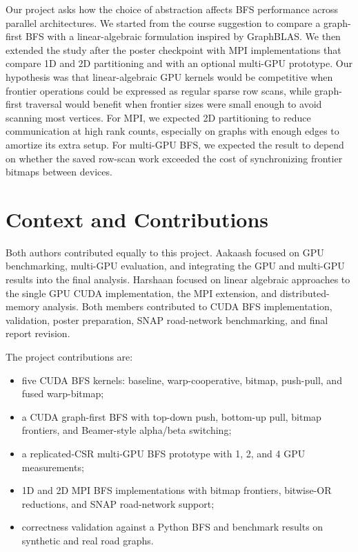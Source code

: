 \documentclass[11pt]{article}
\begin{document}
Our project asks how the choice of abstraction affects BFS performance across
parallel architectures. We started from the course suggestion to compare a
graph-first BFS with a linear-algebraic formulation inspired by GraphBLAS. We
then extended the study after the poster checkpoint with MPI implementations
that compare 1D and 2D partitioning and with an optional multi-GPU prototype.
Our hypothesis was that linear-algebraic GPU kernels would be competitive when
frontier operations could be expressed as regular sparse row scans, while
graph-first traversal would benefit when frontier sizes were small enough to
avoid scanning most vertices. For MPI, we expected 2D partitioning to reduce
communication at high rank counts, especially on graphs with enough edges to
amortize its extra setup. For multi-GPU BFS, we expected the result to depend
on whether the saved row-scan work exceeded the cost of synchronizing frontier
bitmaps between devices.

\section{Context and Contributions}

Both authors contributed equally to this project.
Aakaash focused on GPU benchmarking,
multi-GPU evaluation, and integrating the GPU and multi-GPU results into the
final analysis. Harshaan focused on linear algebraic approaches to the single GPU CUDA implementation, the MPI extension, and distributed-memory analysis. Both members contributed to
CUDA BFS implementation, validation, poster preparation, SNAP road-network
benchmarking, and final report
revision.

The project contributions are:
\begin{itemize}
    \item five CUDA BFS kernels: baseline, warp-cooperative, bitmap,
    push-pull, and fused warp-bitmap;
    \item a CUDA graph-first BFS with top-down push, bottom-up pull, bitmap
    frontiers, and Beamer-style alpha/beta switching;
    \item a replicated-CSR multi-GPU BFS prototype with 1, 2, and 4 GPU
    measurements;
    \item 1D and 2D MPI BFS implementations with bitmap frontiers,
    bitwise-OR reductions, and SNAP road-network support;
    \item correctness validation against a Python BFS and benchmark results on
    synthetic and real road graphs.
\end{itemize}
\end{document}
